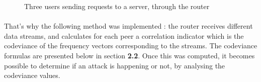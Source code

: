 \documentclass[a4paper]{article}%
\begin{document}
\begin{figure}[H]
	\caption{\scriptsize Three users sending requests to a server, through the router}
\end{figure}

\paragraph{}That's why the following method was implemented : the router receives different data streams, and calculates for each peer a correlation indicator which is the codeviance of the frequency vectors corresponding to the streams. The codeviance formulas are presented below in section \textbf{2.2}. Once this was computed, it becomes possible to determine if an attack is happening or not, by analysing the codeviance values.
\end{document}
